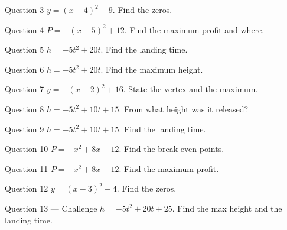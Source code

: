 \documentclass[11pt]{article}
\begin{document}
\begin{qbox}{Question 3}
$y=(x-4)^2-9$. Find the zeros.\workspace{2.2cm}
\end{qbox}

\begin{qbox}{Question 4}
$P=-(x-5)^2+12$. Find the maximum profit and where.\workspace{2.2cm}
\end{qbox}

\begin{qbox}{Question 5}
$h=-5t^2+20t$. Find the landing time.\workspace{2.2cm}
\end{qbox}

\begin{qbox}{Question 6}
$h=-5t^2+20t$. Find the maximum height.\workspace{2.2cm}
\end{qbox}

\begin{qbox}{Question 7}
$y=-(x-2)^2+16$. State the vertex and the maximum.\workspace{2.2cm}
\end{qbox}

\begin{qbox}{Question 8}
$h=-5t^2+10t+15$. From what height was it released?\workspace{2.2cm}
\end{qbox}

\begin{qbox}{Question 9}
$h=-5t^2+10t+15$. Find the landing time.\workspace{2.4cm}
\end{qbox}

\begin{qbox}{Question 10}
$P=-x^2+8x-12$. Find the break-even points.\workspace{2.4cm}
\end{qbox}

\begin{qbox}{Question 11}
$P=-x^2+8x-12$. Find the maximum profit.\workspace{2.4cm}
\end{qbox}

\begin{qbox}{Question 12}
$y=(x-3)^2-4$. Find the zeros.\workspace{2.2cm}
\end{qbox}

\begin{qbox}{Question 13 --- Challenge}
$h=-5t^2+20t+25$. Find the max height and the landing time.\workspace{2.6cm}
\end{qbox}

\clearpage
{}
\end{document}
